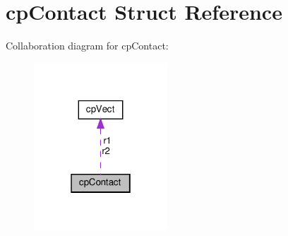 \hypertarget{structcpContact}{}\section{cp\+Contact Struct Reference}
\label{structcpContact}


Collaboration diagram for cp\+Contact\+:
\nopagebreak
\begin{figure}[H]
\begin{center}
\leavevmode
\includegraphics[width=142pt]{structcpContact__coll__graph}
\end{center}
\end{figure}
